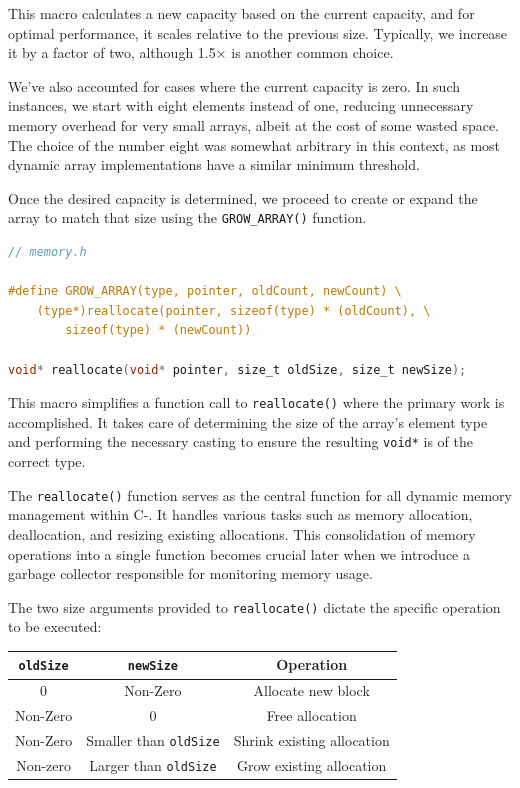This macro calculates a new capacity based on the current capacity, and for optimal performance, it scales relative to the previous size. Typically, we increase it by a factor of two, although 1.5× is another common choice.

We've also accounted for cases where the current capacity is zero. In such instances, we start with eight elements instead of one, reducing unnecessary memory overhead for very small arrays, albeit at the cost of some wasted space. The choice of the number eight was somewhat arbitrary in this context, as most dynamic array implementations have a similar minimum threshold. 

Once the desired capacity is determined, we proceed to create or expand the array to match that size using the \verb+GROW_ARRAY()+ function.

\begin{lstlisting}[language=C]
// memory.h

#define GROW_ARRAY(type, pointer, oldCount, newCount) \
    (type*)reallocate(pointer, sizeof(type) * (oldCount), \
        sizeof(type) * (newCount))

void* reallocate(void* pointer, size_t oldSize, size_t newSize);
\end{lstlisting}

This macro simplifies a function call to \verb.reallocate(). where the primary work is accomplished. It takes care of determining the size of the array's element type and performing the necessary casting to ensure the resulting \verb+void*+ is of the correct type.

The \verb.reallocate(). function serves as the central function for all dynamic memory management within C-. It handles various tasks such as memory allocation, deallocation, and resizing existing allocations. This consolidation of memory operations into a single function becomes crucial later when we introduce a garbage collector responsible for monitoring memory usage.

The two size arguments provided to \verb.reallocate(). dictate the specific operation to be executed:


\begin{table}[h]
{\centering
\begin{tabular}{|c|c|c|}
\hline
\rowcolor[HTML]{EFEFEF} 
\verb.oldSize. & \verb.newSize.              & Operation                  \\ \hline
0              & Non-Zero                    & Allocate new block         \\ \hline
Non-Zero       & 0                           & Free allocation            \\ \hline
Non-Zero       & Smaller than \verb.oldSize. & Shrink existing allocation \\ \hline
Non-zero       & Larger than \verb.oldSize.  & Grow existing allocation   \\ \hline
\end{tabular} \par}
\end{table}


